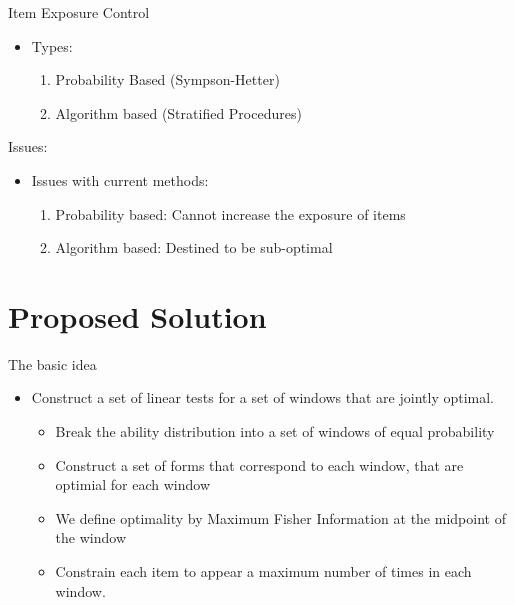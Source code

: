 \documentclass{beamer}
\begin{document}
\begin{frame}{Item Exposure Control}
\begin{itemize}
\item Types:
  \begin{enumerate}[1)]
  \item Probability Based (Sympson-Hetter)
  \item Algorithm based (Stratified Procedures)
  \end{enumerate}
\end{itemize}
\end{frame}

\begin{frame}{Issues:}
\begin{itemize}
\item Issues with current methods:
  \begin{enumerate}[1)]
  \item Probability based: Cannot increase the exposure of items
  \item Algorithm based: Destined to be sub-optimal
  \end{enumerate}
\end{itemize}
\end{frame}



\section{Proposed Solution}
\begin{frame}{The basic idea}
  \begin{itemize}
  \item Construct a set of linear tests for a set of windows that are jointly optimal.
    \begin{itemize}
    \item Break the ability distribution into a set of windows of equal probability
    \item Construct a set of forms that correspond to each window, that are optimial for each window
    \item We define optimality by Maximum Fisher Information at the midpoint of the window
    \item Constrain each item to appear a maximum number of times in each window.
    \end{itemize}
\end{itemize}
\end{frame}
\end{document}
